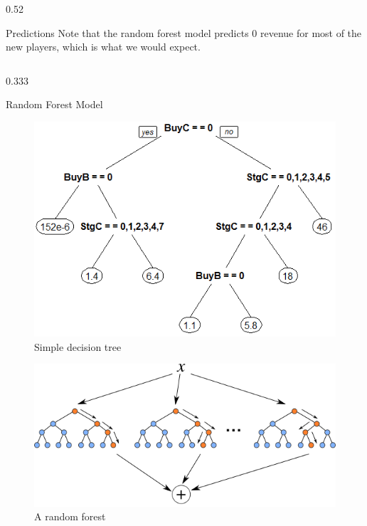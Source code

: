 \documentclass[final,size=a3]{beamer}
\newlength{\threecolwid}
\begin{document}
\begin{frame}[t]
\begin{columns}[t]
\begin{column}{\threecolwid}
\begin{columns}[t]
\begin{column}{0.52\threecolwid}
\begin{block}{Predictions}
Note that the random forest model predicts 0 revenue for most of the new players, which is what we would expect.

\end{block}
\end{column} %

\end{columns} %

\begin{columns}[t]

\begin{column}{0.333\threecolwid} %

\begin{block}{Random Forest Model}

\vspace{-3mm}
\begin{figure}[h]
\caption{Simple decision tree}
\vspace{5mm}
\includegraphics[scale=1.3]{images/SimpleTree}
\end{figure}

\vspace{-7mm}
\begin{figure}[ht]
\caption{A random forest}
\vspace{5mm}
\includegraphics[scale=1.3]{images/randomForestGraph}
\end{figure}


\end{block}
\end{column}
\end{columns}
\end{column}
\end{columns}
\end{frame}
\end{document}
